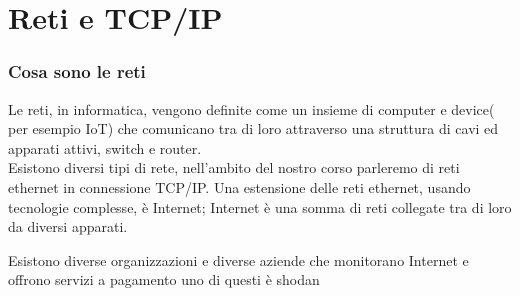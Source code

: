 \chapter{Reti e TCP/IP}	 %

\subsection{Cosa sono le reti}
Le reti, in informatica, vengono definite come un insieme di computer e device( per esempio IoT)  che comunicano tra di loro attraverso una struttura di cavi ed apparati attivi, switch e router.\\
Esistono diversi tipi di rete, nell'ambito del nostro corso parleremo di reti ethernet in connessione TCP/IP.
Una estensione delle reti ethernet, usando tecnologie complesse, è Internet; Internet è una somma di reti collegate tra di loro da diversi apparati.

Esistono diverse organizzazioni e diverse aziende che monitorano Internet e offrono servizi a pagamento uno di questi è shodan \cite{shodandeveloper} \cite{shodan}


